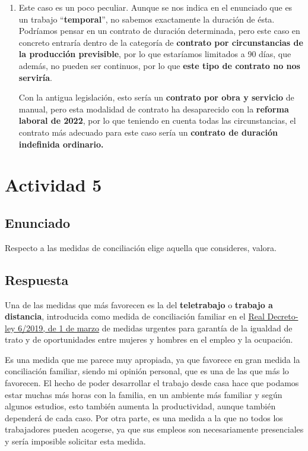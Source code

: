 \begin{enumerate}[label=(\alph*)]
    \item Este caso es un poco peculiar. Aunque se nos indica en el enunciado que es un trabajo ``\textbf{temporal}'', no sabemos exactamente la duración de ésta. Podríamos pensar en un contrato de duración determinada, pero este caso en concreto entraría dentro de la categoría de \textbf{contrato por circunstancias de la producción previsible}, por lo que estaríamos limitados a 90 días, que además, no pueden ser continuos, por lo que \textbf{este tipo de contrato no nos serviría}.

    Con la antigua legislación, esto sería un \textbf{contrato por obra y servicio} de manual, pero esta modalidad de contrato ha desaparecido con la \textbf{reforma laboral de 2022}, por lo que teniendo en cuenta todas las circunstancias, el contrato más adecuado para este caso sería un \textbf{contrato de duración indefinida ordinario.}
\end{enumerate}

\section{Actividad 5}
\subsection{Enunciado}
Respecto a las medidas de conciliación elige aquella que consideres, valora.


\subsection{Respuesta}
Una de las medidas que más favorecen es la del \textbf{teletrabajo} o \textbf{trabajo a distancia}, introducida como medida de conciliación familiar en el \href{https://www.boe.es/buscar/act.php?id=BOE-A-2019-3244&p=20190307&tn=1#a1}{Real Decreto-ley 6/2019, de 1 de marzo} de medidas urgentes para garantía de la igualdad de trato y de oportunidades entre mujeres y hombres en el empleo y la ocupación.

Es una medida que me parece muy apropiada, ya que favorece en gran medida la conciliación familiar, siendo mi opinión personal, que es una de las que más lo favorecen. El hecho de poder desarrollar el trabajo desde casa hace que podamos estar muchas más horas con la familia, en un ambiente más familiar y según algunos estudios, esto también aumenta la productividad, aunque también dependerá de cada caso. Por otra parte, es una medida a la que no todos los trabajadores pueden acogerse, ya que sus empleos son necesariamente presenciales y sería imposible solicitar esta medida.

